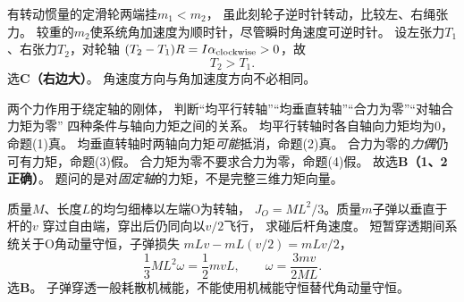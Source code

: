 \problemtext 有转动惯量的定滑轮两端挂$m_1<m_2$，
虽此刻轮子逆时针转动，比较左、右绳张力。
\workings
较重的$m_2$使系统角加速度为顺时针，尽管瞬时角速度可逆时针。
设左张力$T_1$、右张力$T_2$，对轮轴
$(T_2-T_1)R=I\alpha_{\rm clockwise}>0$，故
\[
\boxed{T_2>T_1}.
\]
选\textbf{C（右边大）}。
\crosscheck 角速度方向与角加速度方向不必相同。

\problemtext 两个力作用于绕定轴的刚体，
判断“均平行转轴”“均垂直转轴”“合力为零”“对轴合力矩为零”
四种条件与轴向力矩之间的关系。
\workings
均平行转轴时各自轴向力矩均为0，命题(1)真。
均垂直转轴时两轴向力矩\emph{可能}抵消，命题(2)真。
合力为零的\emph{力偶}仍可有力矩，命题(3)假。
合力矩为零不要求合力为零，命题(4)假。
故选\textbf{B（1、2正确）}。
\crosscheck 题问的是对\emph{固定轴}的力矩，不是完整三维力矩向量。

\problemtext 质量$M$、长度$L$的均匀细棒以左端O为转轴，
$J_O=ML^2/3$。质量$m$子弹以垂直于杆的$v$
穿过自由端，穿出后仍同向以$v/2$飞行，
求碰后杆角速度。
\workings
短暂穿透期间系统关于O角动量守恒，子弹损失
$mLv-mL(v/2)=mLv/2$，
\[
\frac13ML^2\omega=\frac12mvL,
\qquad
\boxed{\omega=\frac{3mv}{2ML}}.
\]
选\textbf{B}。
\crosscheck 子弹穿透一般耗散机械能，不能使用机械能守恒替代角动量守恒。
